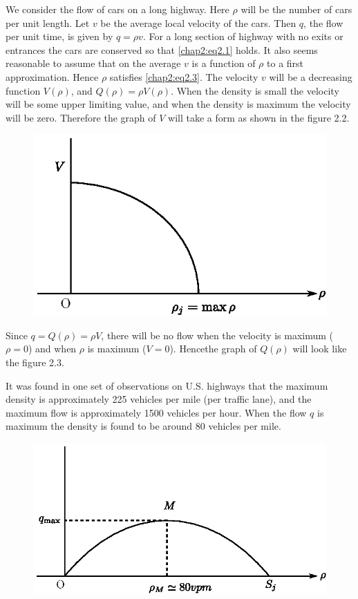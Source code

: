 We consider the flow of cars on a long highway. Here $\rho$ will be the number of cars per unit length. Let $v$ be the average local velocity of the cars. Then $q$, the flow per unit time, is given by $q=\rho v$. For a long section of highway with no exits or entrances the cars are conserved so that \eqref{chap2:eq2.1} holds. It also seems reasonable to assume that on the average $v$ is a function of $\rho$ to a first approximation. Hence $\rho$ satisfies \eqref{chap2:eq2.3}. The velocity $v$ will be a decreasing function $V(\rho)$, and $Q(\rho)=\rho V(\rho)$. When the density is small the velocity will be some upper limiting value, and when the density is maximum the velocity will be zero. Therefore the graph of $V$ will take a form as shown in the figure 2.2.

\begin{figure}[H]
\centering
\includegraphics[scale=.9]{figures/fig61-2.2.eps}
\caption{}
\label{chap1:fig2.2}
\end{figure}

Since $q=Q(\rho)=\rho V$, there will be no flow when the velocity is maximum (\ie $\rho =0$) and when $\rho$ is maximum (\ie $V=0$). Hence\pageoriginale the graph of $Q(\rho)$ will look like the figure 2.3.

It was found in one set of observations on U.S. highways that the maximum density is approximately 225 vehicles per mile (per traffic lane), and the maximum flow is approximately 1500 vehicles per hour. When the flow $q$ is maximum the density is found to be around 80 vehicles per mile.

\begin{figure}[H]
\centering
\includegraphics{figures/fig61-2.3.eps}
\caption{}
\label{chap1:fig2.3}
\end{figure}

